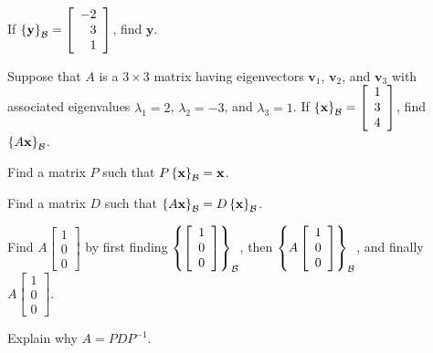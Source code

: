 \documentclass[12pt]{article}
\newcommand{\vs}[1]{\vspace{#1in}}
\newcommand{\vvec}{{\mathbf v}}
\newcommand{\xvec}{{\mathbf x}}
\newcommand{\yvec}{{\mathbf y}}
\newcommand{\threevec}[3]{\left[\begin{array}{r}#1 \\ #2 \\ #3
  \end{array}\right]}
\newcommand{\bcal}{{\cal B}}
\newcommand{\coords}[2]{\left\{#1\right\}_{#2}}
\begin{document}
\begin{enumerate}
  \vs{1}
  If $\coords{\yvec}{\bcal}=\threevec{-2}{3}1$, find $\yvec$.

  \vs{1}
  Suppose that $A$ is a $3\times3$ matrix having eigenvectors
  $\vvec_1$, $\vvec_2$, and $\vvec_3$ with associated eigenvalues
  $\lambda_1 = 2$, $\lambda_2=-3$, and $\lambda_3=1$.  If
  $\coords{\xvec}{\bcal} = \threevec134$, find
  $\coords{A\xvec}{\bcal}$.

  \vs{1}
  Find a matrix $P$ such that $P\coords{\xvec}{\bcal} = \xvec$.

  \vs{1}
  Find a matrix $D$ such that $\coords{A\xvec}{\bcal} =
  D\coords{\xvec}{\bcal}$.

  \vs{1}
  \newpage
  Find $A\threevec100$ by first finding
  $\coords{\threevec100}{\bcal}$, then
  $\coords{A\threevec100}{\bcal}$, and finally $A\threevec100$.

  \vs{3}
  Explain why $A = PDP^{-1}$.

  



\end{enumerate}
\end{document}
